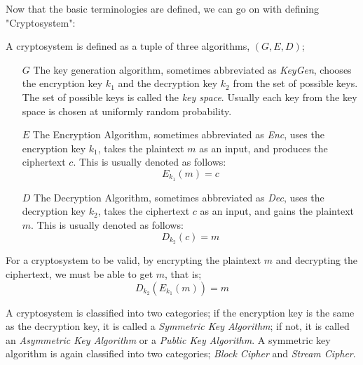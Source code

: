 \documentclass{report}
\begin{document}
		Now that the basic terminologies are defined, we can go on with defining "Cryptosystem":
		\begin{defn}[Cryptosystem]
			A cryptosystem is defined as a tuple of three algorithms, $(G,E,D)$;
			\begin{itemize}
				\item[$G$]
				\subitem The key generation algorithm, sometimes abbreviated as \emph{KeyGen}, chooses the encryption key $k_1$ and the decryption key $k_2$ from the set of possible keys. The set of possible keys is called the \emph{key space}. Usually each key from the key space is chosen at uniformly random probability.
				\item[$E$]
				\subitem The Encryption Algorithm, sometimes abbreviated as \emph{Enc}, uses the encryption key $k_1$, takes the plaintext $m$ as an input, and produces the ciphertext $c$. This is usually denoted as follows:
				\begin{displaymath}
					E_{k_1}(m)=c
				\end{displaymath}
				\item[$D$]
				\subitem The Decryption Algorithm, sometimes abbreviated as \emph{Dec}, uses the decryption key $k_2$, takes the ciphertext $c$ as an input, and gains the plaintext $m$. This is usually denoted as follows:
				\begin{displaymath}
					D_{k_2}(c)=m
				\end{displaymath}
			\end{itemize}
			For a cryptosystem to be valid, by encrypting the plaintext $m$ and decrypting the ciphertext, we must be able to get $m$, that is;
			\begin{displaymath}
				D_{k_2}(E_{k_1}(m))=m
			\end{displaymath}
		\end{defn}
		
		A cryptosystem is classified into two categories; if the encryption key is the same as the decryption key, it is called a \emph{Symmetric Key Algorithm}; if not, it is called an \emph{Asymmetric Key Algorithm} or a \emph{Public Key Algorithm}. A symmetric key algorithm is again classified into two categories; \emph{Block Cipher} and \emph{Stream Cipher}.
		
\end{document}
